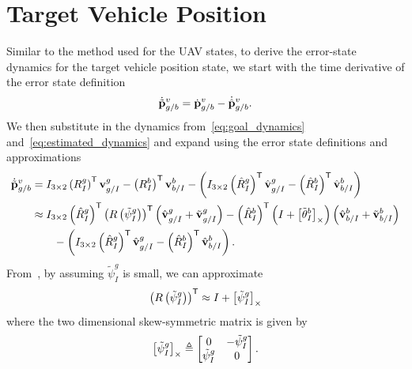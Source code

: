 \section{Target Vehicle Position}
Similar to the method used for the UAV states, to derive the error-state
dynamics for the target vehicle position state, we start with the time
derivative of the error state definition
\begin{equation}
  \dot{\tilde{\mathrm{\mathbf{p}}}}_{g/b}^{v} = \dot{\mathrm{\mathbf{p}}}_{g/b}^{v} -
  \dot{\hat{\mathrm{\mathbf{p}}}}_{g/b}^{v}.
\end{equation}
We then substitute in the dynamics from~\eqref{eq:goal_dynamics}
and~\eqref{eq:estimated_dynamics} and expand using the error state definitions
and approximations
\begin{align}
  \dot{\tilde{\mathrm{\mathbf{p}}}}_{g/b}^{v}
  &=
  I_{3 \times 2} \left( R_{I}^{g} \right)^{\mathsf{T}}
  \mathrm{\mathbf{v}}_{g/I}^{g} - \left( R_{I}^{b} \right)^{\mathsf{T}}
  \mathrm{\mathbf{v}}_{b/I}^{b}
  -
  \left(
  I_{3 \times 2} \left( \hat{R}_{I}^{g} \right)^{\mathsf{T}}
  \hat{\mathrm{\mathbf{v}}}_{g/I}^{g} - \left( \hat{R}_{I}^{b} \right)^{\mathsf{T}}
  \hat{\mathrm{\mathbf{v}}}_{b/I}^{b}
  \right) \\
  &\approx
  \label{eq:goal_pos_err_state1}
  I_{3 \times 2} \left( \hat{R}_{I}^{g} \right)^{\mathsf{T}}
  \left( R \left( \tilde{\psi}_{I}^{g} \right) \right)^{\mathsf{T}}
  \left( \hat{\mathrm{\mathbf{v}}}_{g/I}^{g} + \tilde{\mathrm{\mathbf{v}}}_{g/I}^{g} \right) - \left(
  \hat{R}_{I}^{b} \right)^{\mathsf{T}}
  \left( I + \left[ \tilde{\mathrm{\mathbf{\theta}}}_I^b \right]_{\times} \right)
  \left( \hat{\mathrm{\mathbf{v}}}_{b/I}^{b} + \tilde{\mathrm{\mathbf{v}}}_{b/I}^{b} \right) \\
  & \qquad -
  \left(
  I_{3 \times 2} \left( \hat{R}_{I}^{g} \right)^{\mathsf{T}}
  \hat{\mathrm{\mathbf{v}}}_{g/I}^{g} - \left( \hat{R}_{I}^{b} \right)^{\mathsf{T}}
  \hat{\mathrm{\mathbf{v}}}_{b/I}^{b}
  \right). \nonumber
\end{align}
From~\cite{sola2018micro}, by assuming $\tilde{\psi}_I^g$ is small, we can approximate 
\begin{equation}
  \left( R \left( \tilde{\psi}_I^g \right) \right)^{\mathsf{T}} \approx I +
  \left[ \tilde{\psi}_I^g \right]_{\times}
  \label{eq:2d_err_rot_approx}
\end{equation}
where the two dimensional skew-symmetric matrix is given by
\begin{equation}
  \left[ \tilde{\psi}_I^g \right]_{\times} \triangleq
  \begin{bmatrix}
    0 & -\tilde{\psi}_I^g \\
    \tilde{\psi}_I^g & 0
  \end{bmatrix}.
\end{equation}
